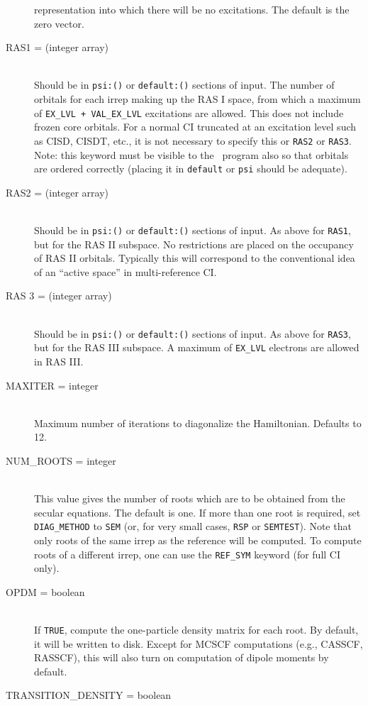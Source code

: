 \begin{description}
representation into which there will be no excitations.
The default is the zero vector.
\item[RAS1 = (integer array)]\mbox{}\\
Should be in {\tt psi:()} or {\tt default:()} sections of input.
The number of orbitals for each irrep making up the RAS I space,
from which a maximum of {\tt EX\_LVL + VAL\_EX\_LVL} excitations
are allowed.
This does not include frozen core orbitals.  For a normal
CI truncated at an excitation level such as CISD, CISDT, etc., it is
not necessary to specify this or {\tt RAS2} or {\tt RAS3}.
Note: this keyword must be visible to the \PSItransqt\ program
also so that orbitals are ordered correctly (placing it in 
{\tt default} or {\tt psi} should be adequate).
\item[RAS2 = (integer array)]\mbox{}\\
Should be in {\tt psi:()} or {\tt default:()} sections of input.
As above for {\tt RAS1}, but for the RAS II subspace.  
No restrictions are placed on the occupancy of RAS II orbitals.
Typically this will correspond to the conventional idea of
an ``active space'' in multi-reference CI.
\item[RAS 3 = (integer array)]\mbox{}\\
Should be in {\tt psi:()} or {\tt default:()} sections of input.
As above for {\tt RAS3}, but for the RAS III subspace.
A maximum of {\tt EX\_LVL} electrons are allowed in RAS III.
\item[MAXITER = integer]\mbox{}\\
Maximum number of iterations to diagonalize the Hamiltonian.
Defaults to 12.
\item[NUM\_ROOTS = integer]\mbox{}\\
This value gives the number of roots which are to be obtained from
the secular equations.  The default is one.  If more than one root
is required, set {\tt DIAG\_METHOD} to {\tt SEM} (or, for very small cases,
{\tt RSP} or {\tt SEMTEST}).  Note that only roots of the same
irrep as the reference will be computed.  To compute roots of a different
irrep, one can use the {\tt REF\_SYM} keyword (for full CI only).
\item[OPDM = boolean]\mbox{}\\
If {\tt TRUE}, compute the one-particle density matrix for each root.  
By default, it will be written to disk.  Except for 
MCSCF computations (e.g., CASSCF, RASSCF), this will also turn on computation
of dipole moments by default.
\item[TRANSITION\_DENSITY = boolean]\mbox{}\\

\end{description}
